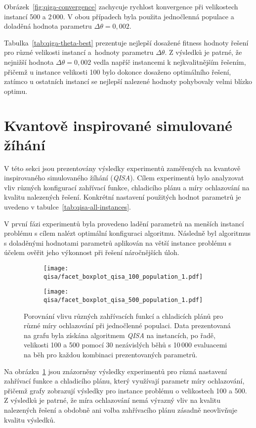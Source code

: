 Obrázek~\ref{fig:qiga-convergence} zachycuje rychlost konvergence při velikostech instancí 500 a 2\,000. 
V obou případech byla použita jednočlenná populace a doladěná hodnota parametru $\Delta\theta = 0,002$.

Tabulka~\ref{tab:qiga-theta-best} prezentuje nejlepší dosažené fitness hodnoty řešení pro různé velikosti instancí a~hodnoty parametru $\Delta\theta$. 
Z výsledků je patrné, že nejnižší hodnota $\Delta\theta = 0,002$ vedla napříč instancemi k nejkvalitnějším řešením, přičemž u instance velikosti 100 bylo dokonce dosaženo optimálního řešení, zatímco u ostatních instancí se nejlepší nalezené hodnoty pohybovaly velmi blízko optimu. 

\section{Kvantově inspirované simulované žíhání}\label{sec:exp-qiga}
V této sekci jsou prezentovány výsledky experimentů zaměřených na kvantově inspirovaného simulovaného žíhání (\emph{QISA}). 
Cílem experimentů bylo analyzovat vliv různých konfigurací zahřívací funkce, chladicího plánu a míry ochlazování na kvalitu nalezených řešení. 
Konkrétní nastavení použitých hodnot parametrů je uvedeno v tabulce~\ref{tab:qisa-all-instances}. 

V první fázi experimentů byla provedeno ladění parametrů na menších instancí problému s cílem nalézt optimální konfiguraci algoritmu. 
Následně byl algoritmus s doladěnými hodnotami parametrů aplikován na větší instance problému s účelem ověřit jeho výkonnost při řešení náročnějších úloh. 

\begin{figure}[ht!]
    \centering
    \begin{subfigure}[b]{\linewidth}
        \texttt{[image: qisa/facet\_boxplot\_qisa\_100\_population\_1.pdf]}
    \end{subfigure}
    \begin{subfigure}[b]{\linewidth}
        \texttt{[image: qisa/facet\_boxplot\_qisa\_500\_population\_1.pdf]}
    \end{subfigure}
    \caption{Porovnání vlivu různých zahřívacích funkcí a chladicích plánů pro různé míry ochlazování při jednočlenné populaci. Data prezentovaná na grafu byla získána algoritmem \emph{QISA} na instancích, po řadě, velikosti 100 a 500 pomocí 30 nezávislých běhů s 10\,000 evaluacemi na běh pro každou kombinaci prezentovaných parametrů.}
    \label{fig:qisa-fining}
\end{figure}
Na obrázku~\ref{fig:qisa-fining} jsou znázorněny výsledky experimentů pro různá nastavení zahřívací funkce a chladicího plánu, který využívají parametr míry ochlazování, přičemž grafy zobrazují výsledky pro instance problému o velikostech 100 a 500. 
Z výsledků je patrné, že míra ochlazování nemá výrazný vliv na kvalitu nalezených řešení a obdobně ani volba zahřívacího plánu zásadně neovlivňuje kvalitu výsledků. 

